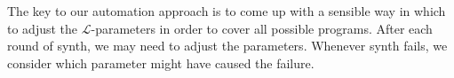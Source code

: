 

The key to our automation approach is to come up with a sensible way in which to
adjust the $\mathcal{L}$-parameters in order to cover all possible programs.
After each round of {\sc synth}, we may need to adjust the parameters.  
Whenever {\sc synth} fails, we consider which parameter might have caused the
failure.  



